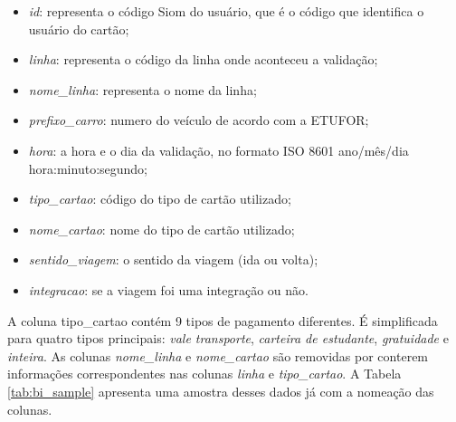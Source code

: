\documentclass[        
    a4paper,          %
    12pt,             %
    chapter=TITLE,    %
    section=Title,    %
    subsection=Title, %
    oneside,          %
    english,          %
    spanish,          %
    brazil,           %
    fleqn             %
]{abntex2}
\begin{document}
  \begin{itemize}
  \tightlist
  \item
    \emph{id}: representa o código Siom do usuário, que é o código que identifica o usuário do cartão;
  \item
    \emph{linha}: representa o código da linha onde aconteceu a validação;
  \item
    \emph{nome\_linha}: representa o nome da linha;
  \item
    \emph{prefixo\_carro}: numero do veículo de acordo com a ETUFOR;
  \item
    \emph{hora}: a hora e o dia da validação, no formato ISO 8601 ano/mês/dia hora:minuto:segundo;
  \item
    \emph{tipo\_cartao}: código do tipo de cartão utilizado;
  \item
    \emph{nome\_cartao}: nome do tipo de cartão utilizado;
  \item
    \emph{sentido\_viagem}: o sentido da viagem (ida ou volta);
  \item
    \emph{integracao}: se a viagem foi uma integração ou não.
  \end{itemize}
  
  A coluna tipo\_cartao contém 9 tipos de pagamento diferentes. É simplificada para quatro tipos principais: \emph{vale transporte}, \emph{carteira de estudante}, \emph{gratuidade} e \emph{inteira}. As colunas \emph{nome\_linha} e \emph{nome\_cartao} são removidas por conterem informações correspondentes nas colunas \emph{linha} e \emph{tipo\_cartao}. A Tabela \ref{tab:bi_sample} apresenta uma amostra desses dados já com a nomeação das colunas.
  
\end{document}
